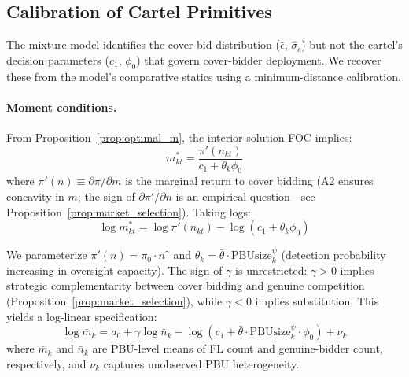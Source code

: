 
\subsection{Calibration of Cartel Primitives}
\label{sec:calibration}

The mixture model identifies the cover-bid distribution
($\hat{\epsilon}$, $\hat{\sigma}_c$) but not the cartel's
decision parameters ($c_1$, $\phi_0$) that govern cover-bidder
deployment. We recover these from the model's comparative statics
using a minimum-distance calibration.

\paragraph{Moment conditions.}
From Proposition~\ref{prop:optimal_m}, the interior-solution FOC
implies:
\begin{equation}
  m^*_{kt} = \frac{\pi'(n_{kt})}{c_1 + \theta_k \phi_0}
  \label{eq:foc_m}
\end{equation}
where $\pi'(n) \equiv \partial \pi / \partial m$ is the marginal
return to cover bidding (A2 ensures concavity in $m$; the sign
of $\partial \pi' / \partial n$ is an empirical question---see
Proposition~\ref{prop:market_selection}). Taking logs:
\begin{equation}
  \log m^*_{kt} = \log \pi'(n_{kt}) - \log(c_1 + \theta_k \phi_0)
  \label{eq:log_foc}
\end{equation}

We parameterize $\pi'(n) = \pi_0 \cdot n^{\gamma}$ and
$\theta_k = \bar{\theta} \cdot \text{PBUsize}_k^{\psi}$ (detection
probability increasing in oversight capacity). The sign of $\gamma$
is unrestricted: $\gamma > 0$ implies strategic complementarity
between cover bidding and genuine competition
(Proposition~\ref{prop:market_selection}), while $\gamma < 0$ implies
substitution. This yields a log-linear specification:
\begin{equation}
  \log \bar{m}_k = a_0 + \gamma \log \bar{n}_k
  - \log\!\left(c_1 + \bar{\theta} \cdot \text{PBUsize}_k^{\psi}
  \cdot \phi_0\right) + \nu_k
  \label{eq:calibration_moment}
\end{equation}
where $\bar{m}_k$ and $\bar{n}_k$ are PBU-level means of FL count
and genuine-bidder count, respectively, and $\nu_k$ captures
unobserved PBU heterogeneity.

